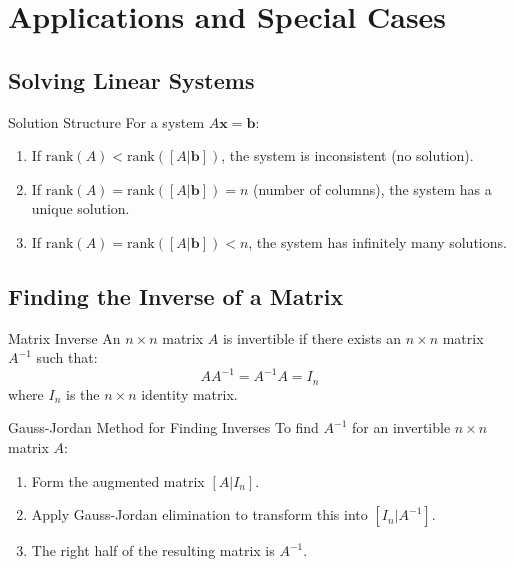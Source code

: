 \documentclass[12pt,a4paper]{article}
\newcommand{\vv}[1]{\mathbf{#1}}
\newcommand{\rank}{\text{rank}}
\begin{document}
	\section{Applications and Special Cases}
	
	\subsection{Solving Linear Systems}
	
	\begin{theorem}{Solution Structure}
		For a system $A\vv{x} = \vv{b}$:
		\begin{enumerate}[label=(\roman*)]
			\item If $\rank(A) < \rank([A|\vv{b}])$, the system is inconsistent (no solution).
			\item If $\rank(A) = \rank([A|\vv{b}]) = n$ (number of columns), the system has a unique solution.
			\item If $\rank(A) = \rank([A|\vv{b}]) < n$, the system has infinitely many solutions.
		\end{enumerate}
	\end{theorem}
	
	\subsection{Finding the Inverse of a Matrix}
	
	\begin{definition}{Matrix Inverse}
		An $n \times n$ matrix $A$ is invertible if there exists an $n \times n$ matrix $A^{-1}$ such that:
		\[
		AA^{-1} = A^{-1}A = I_n
		\]
		where $I_n$ is the $n \times n$ identity matrix.
	\end{definition}
	
	\begin{theorem}{Gauss-Jordan Method for Finding Inverses}
		To find $A^{-1}$ for an invertible $n \times n$ matrix $A$:
		\begin{enumerate}
			\item Form the augmented matrix $[A|I_n]$.
			\item Apply Gauss-Jordan elimination to transform this into $[I_n|A^{-1}]$.
			\item The right half of the resulting matrix is $A^{-1}$.
		\end{enumerate}
	\end{theorem}
	
\end{document}
